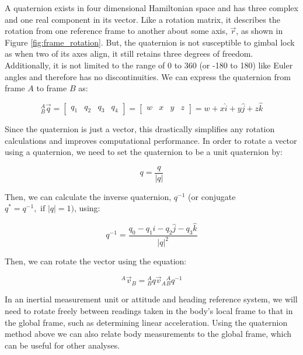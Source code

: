 A quaternion exists in four dimensional Hamiltonian space and has three complex and one real component in its vector. 
Like a rotation matrix, it describes the rotation from one reference frame to another about some axis, $\vec{r}$, as shown in Figure \ref{fig:frame_rotation}.
But, the quaternion is not susceptible to gimbal lock as when two of its axes align, it still retains three degrees of freedom.
Additionally, it is not limited to the range of 0 to 360 (or -180 to 180) like Euler angles and therefore has no discontinuities.
We can express the quaternion from frame $A$ to frame $B$ as:

\begin{equation*}
    {}^A_B \vec{q} = \left[
        \begin{matrix}
            q_1 & q_2 & q_3 & q_4
        \end{matrix}
    \right] = 
    \left[
        \begin{matrix}
            w & x & y & z
        \end{matrix}
    \right] = 
    w + x\hat{i} + y\hat{j} + z\hat{k}
\end{equation*}

Since the quaternion is just a vector, this drastically simplifies any rotation calculations and improves computational performance.
In order to rotate a vector using a quaternion, we need to set the quaternion to be a unit quaternion by:

\begin{equation*}
    q = \frac{q}{|q|}
\end{equation*}

Then, we can calculate the inverse quaternion, ${q}^{-1}$ (or conjugate $q^*=q^{-1}, \text{ if } |q|=1)$, using:

\begin{equation*}
    q^{-1} = \frac{q_0 - q_1\hat{i} - q_2\hat{j} - q_3\hat{k}}{|q|^2}
\end{equation*}

Then, we can rotate the vector using the equation:

\begin{equation*}
    {}^A \vec{v}_B = {}^A_Bq \vec{v}_A {}^A_Bq^{-1}
\end{equation*}

In an inertial measurement unit or attitude and heading reference system, we will need to rotate freely between readings taken in the body's local frame to that in the global frame, such as determining linear acceleration.
Using the quaternion method above we can also relate body measurements to the global frame, which can be useful for other analyses.

